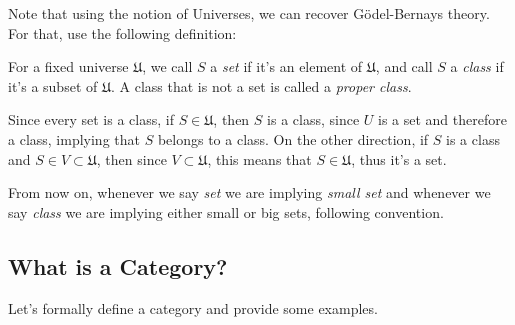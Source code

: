 Note that using the notion of Universes, we can recover Gödel-Bernays theory. For that,
use the following definition:
\begin{definition}
  For a fixed universe $\mathfrak U$, we call $S$ a \textit{set} if it's an element
  of $\mathfrak U$, and call $S$ a \textit{class} if it's a subset of $\mathfrak U$.
  A class that is not a set is called a \textit{proper class}.
\end{definition}
Since every set is a class, if $S \in \mathfrak U$, then $S$ is a class,
since $U$ is a set and therefore a class, implying that $S$ belongs to a class.
On the other direction, if $S$ is a class and $S \in V \subset \mathfrak U$,
then since $V \subset \mathfrak U$, this means that $S \in \mathfrak U$, thus
it's a set.

From now on, whenever we say \textit{set} we are implying \textit{small set}
and whenever we say \textit{class} we are implying either small or big sets,
following \citet{borceux1994handbook} convention.


\subsection{What is a Category?}

Let's formally define a category and provide some examples.

